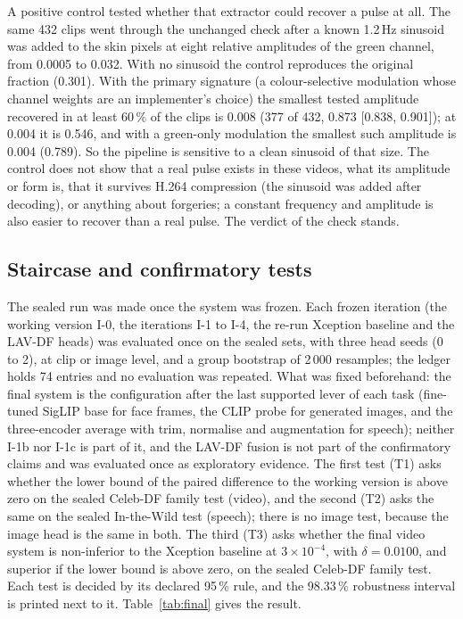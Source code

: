 \documentclass[conference,a4paper]{IEEEtran_nodash}
\begin{document}
A positive control tested whether that extractor could recover a pulse at all.
The same 432 clips went through the unchanged check after a known 1.2\,Hz
sinusoid was added to the skin pixels at eight relative amplitudes of the green
channel, from 0.0005 to 0.032. With no sinusoid the control reproduces the
original fraction (0.301). With the primary signature (a colour-selective
modulation whose channel weights are an implementer's choice) the smallest tested
amplitude recovered in at least 60\,\% of the clips is 0.008 (377 of 432, 0.873
[0.838, 0.901]); at 0.004 it is 0.546, and with a green-only modulation the
smallest such amplitude is 0.004 (0.789). So the pipeline is sensitive to a clean
sinusoid of that size. The control does not show that a real pulse exists in
these videos, what its amplitude or form is, that it survives H.264 compression
(the sinusoid was added after decoding), or anything about forgeries; a constant
frequency and amplitude is also easier to recover than a real pulse. The verdict
of the check stands. %

\subsection{Staircase and confirmatory tests}
The sealed run was made once the system was frozen. Each frozen iteration (the
working version I-0, the iterations I-1 to I-4, the re-run Xception baseline and
the LAV-DF heads) was evaluated once on the sealed sets, with three head seeds
(0 to 2), at clip or image level, and a group bootstrap of 2\,000 resamples; the
ledger holds 74 entries and no evaluation was repeated. %
What was fixed beforehand: the final system is
the configuration after the last supported lever of each task (fine-tuned SigLIP
base for face frames, the CLIP probe for generated images, and the
three-encoder average with trim, normalise and augmentation for speech); neither
I-1b nor I-1c is part of it, and the LAV-DF fusion is not part of the
confirmatory claims and was evaluated once as exploratory evidence. The first
test (T1) asks whether the lower bound of the paired difference to the working
version is above zero on the sealed Celeb-DF family test (video), and the second
(T2) asks the same on the sealed In-the-Wild test (speech); there is no image
test, because the image head is the same in both. The third (T3) asks whether the
final video system is non-inferior to the Xception baseline at $3\times10^{-4}$,
with $\delta=0.0100$, and superior if the lower bound is above zero, on the
sealed Celeb-DF family test. Each test is decided by
its declared 95\,\% rule, and the 98.33\,\% robustness interval is printed next
to it. Table~\ref{tab:final} gives the result.
\end{document}
